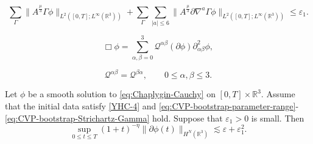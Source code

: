 \documentclass[10pt,a4paper]{amsart}
\def\cQ{\mathcal Q}
\def\ls{\lesssim}
\def\ve{\varepsilon}
\begin{document}
	\begin{equation}
		\label{eq:CVP-bootstrap-Strichartz-Gamma}
		\sum_{\Gamma}
		\big\|
		A^{\frac{\mu}{3}}
		\Gamma\phi
		\big\|_{L^2([0,T];L^\infty(\mathbb R^3))}
		+
		\sum_{\Gamma}
		\sum_{|a|\le 6}
		\big\|
		A^{\frac{\mu}{3}}
		\partial\nabla^a\Gamma\phi
		\big\|_{L^2([0,T];L^\infty(\mathbb R^3))}
		\le
		\varepsilon_1.
	\end{equation}

	\begin{equation}\label{eq:Chaplygin-energy-reformulation}
		\Box\phi
		=\sum_{\alpha,\beta=0}^3
		\cQ^{\alpha\beta}(\partial\phi)
		\partial_{\alpha\beta}^2\phi,
	\end{equation}

	\begin{equation}\label{eq:Chaplygin-energy-symmetry}
		\cQ^{\alpha\beta}
		=
		\cQ^{\beta\alpha},
		\qquad
		0\le\alpha,\beta\le3.
	\end{equation}

	\begin{lemma}\label{lem:Chaplygin-energy-estimate}
		Let \(\phi\) be a smooth solution to
		\eqref{eq:Chaplygin-Cauchy} on \([0,T]\times\mathbb R^3\).
		Assume that the initial data satisfy \eqref{YHC-4} and
		\eqref{eq:CVP-bootstrap-parameter-range}-\eqref{eq:CVP-bootstrap-Strichartz-Gamma}
		hold. Suppose that \(\ve_1>0\) is small. Then
		\begin{equation}\label{eq:Chaplygin-energy-growth-epsilon1}
			\sup_{0\le t\le T}(1+t)^{-\eta}\|\partial\phi(t)\|_{H^N(\mathbb R^3)}
			\ls
			\ve +\ve_1^2.
		\end{equation}
	\end{lemma}
\end{document}
